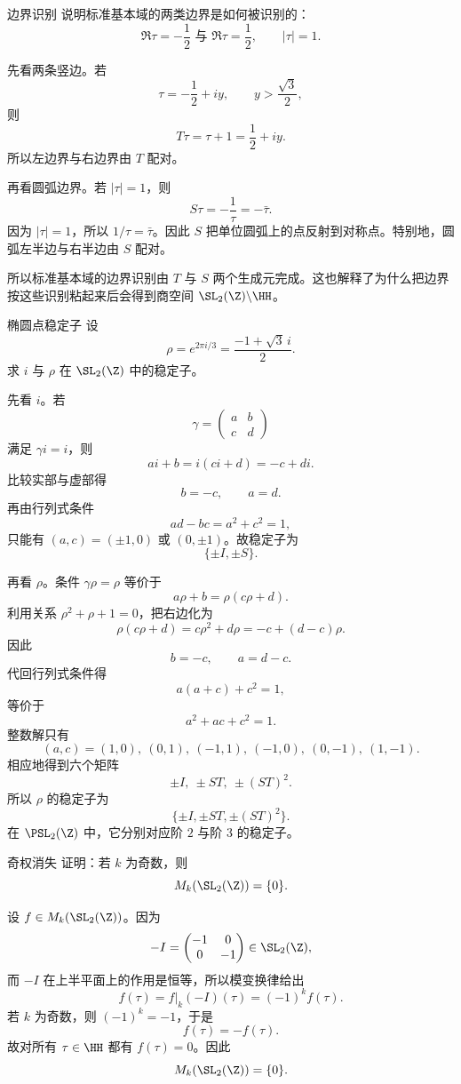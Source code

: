 \begin{problem}{边界识别}
\medium
说明标准基本域的两类边界是如何被识别的：
\[
\Re\tau=-\frac12 \text{ 与 } \Re\tau=\frac12,
\qquad |\tau|=1.
\]
\end{problem}
\begin{solution}
先看两条竖边。若
\[
\tau=-\frac12+iy,
\qquad y>\frac{\sqrt3}{2},
\]
则
\[
T\tau=\tau+1=\frac12+iy.
\]
所以左边界与右边界由 $T$ 配对。

再看圆弧边界。若 $|\tau|=1$，则
\[
S\tau=-\frac1\tau=-\bar\tau.
\]
因为 $|\tau|=1$，所以 $1/\tau=\bar\tau$。因此 $S$ 把单位圆弧上的点反射到对称点。特别地，圆弧左半边与右半边由 $S$ 配对。

所以标准基本域的边界识别由 $T$ 与 $S$ 两个生成元完成。这也解释了为什么把边界按这些识别粘起来后会得到商空间 $\SL_2(\Z)\backslash \HH$。
\end{solution}

\begin{problem}{椭圆点稳定子}
\medium
设
\[
\rho=e^{2\pi i/3}=\frac{-1+\sqrt3\,i}{2}.
\]
求 $i$ 与 $\rho$ 在 $\SL_2(\Z)$ 中的稳定子。
\end{problem}
\begin{solution}
先看 $i$。若
\[
\gamma=\begin{pmatrix}a&b\\c&d\end{pmatrix}
\]
满足 $\gamma i=i$，则
\[
ai+b=i(ci+d)=-c+di.
\]
比较实部与虚部得
\[
b=-c,\qquad a=d.
\]
再由行列式条件
\[
ad-bc=a^2+c^2=1,
\]
只能有 $(a,c)=(\pm1,0)$ 或 $(0,\pm1)$。故稳定子为
\[
\{\pm I,\pm S\}.
\]

再看 $\rho$。条件 $\gamma\rho=\rho$ 等价于
\[
a\rho+b=\rho(c\rho+d).
\]
利用关系 $\rho^2+\rho+1=0$，把右边化为
\[
\rho(c\rho+d)=c\rho^2+d\rho=-c+(d-c)\rho.
\]
因此
\[
b=-c,\qquad a=d-c.
\]
代回行列式条件得
\[
a(a+c)+c^2=1,
\]
等价于
\[
a^2+ac+c^2=1.
\]
整数解只有
\[
(a,c)=(1,0),\ (0,1),\ (-1,1),\ (-1,0),\ (0,-1),\ (1,-1).
\]
相应地得到六个矩阵
\[
\pm I,\ \pm ST,\ \pm (ST)^2.
\]
所以 $\rho$ 的稳定子为
\[
\{\pm I,\pm ST,\pm (ST)^2\}.
\]
在 $\PSL_2(\Z)$ 中，它分别对应阶 $2$ 与阶 $3$ 的稳定子。
\end{solution}

\begin{problem}{奇权消失}
\medium
证明：若 $k$ 为奇数，则
\[
M_k(\SL_2(\Z))=\{0\}.
\]
\end{problem}
\begin{solution}
设 $f\in M_k(\SL_2(\Z))$。因为
\[
-I=\begin{pmatrix}-1&0\\0&-1\end{pmatrix}\in \SL_2(\Z),
\]
而 $-I$ 在上半平面上的作用是恒等，所以模变换律给出
\[
f(\tau)=f|_k(-I)(\tau)=(-1)^k f(\tau).
\]
若 $k$ 为奇数，则 $(-1)^k=-1$，于是
\[
f(\tau)=-f(\tau).
\]
故对所有 $\tau\in\HH$ 都有 $f(\tau)=0$。因此
\[
M_k(\SL_2(\Z))=\{0\}.
\]
\end{solution}

